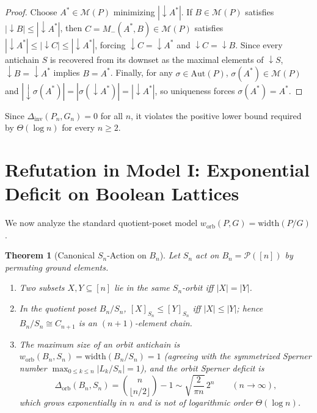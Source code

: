 \documentclass[11pt,a4paper]{article}
\newtheorem{theorem}{Theorem}[section]
\theoremstyle{definition}
\newcommand{\Bn}{B_n}
\newcommand{\Sn}{S_n}
\newcommand{\Aut}{\mathrm{Aut}}
\newcommand{\width}{\mathrm{width}}
\newcommand{\worb}{w_{\mathrm{orb}}}
\newcommand{\Dorb}{\Delta_{\mathrm{orb}}}
\newcommand{\Dinv}{\Delta_{\mathrm{inv}}}
\begin{document}
\begin{proof}
Choose $A^* \in \mathcal{M}(P)$ minimizing $|{\downarrow}A^*|$. If $B \in \mathcal{M}(P)$ satisfies $|{\downarrow}B| \le |{\downarrow}A^*|$, then $C = M_-(A^*,B) \in \mathcal{M}(P)$ satisfies $|{\downarrow}A^*| \le |{\downarrow}C| \le |{\downarrow}A^*|$, forcing ${\downarrow}C = {\downarrow}A^*$ and ${\downarrow}C = {\downarrow}B$. Since every antichain $S$ is recovered from its downset as the maximal elements of ${\downarrow}S$, ${\downarrow}B = {\downarrow}A^*$ implies $B = A^*$. Finally, for any $\sigma \in \Aut(P)$, $\sigma(A^*) \in \mathcal{M}(P)$ and $|{\downarrow}\sigma(A^*)| = |\sigma({\downarrow}A^*)| = |{\downarrow}A^*|$, so uniqueness forces $\sigma(A^*) = A^*$.
\end{proof}

Since $\Dinv(P_n, G_n) = 0$ for all $n$, it violates the positive lower bound required by $\Theta(\log n)$ for every $n \ge 2$.

\section{Refutation in Model I: Exponential Deficit on Boolean Lattices}

We now analyze the standard quotient-poset model $\worb(P,G) = \width(P/G)$.

\begin{theorem}[Canonical $\Sn$-Action on $\Bn$]\label{thm:bn-sn}
Let $\Sn$ act on $\Bn = \mathcal{P}([n])$ by permuting ground elements.
\begin{enumerate}
  \item[(a)] Two subsets $X, Y \subseteq [n]$ lie in the same $\Sn$-orbit iff $|X| = |Y|$.
  \item[(b)] In the quotient poset $\Bn/\Sn$, $[X]_{\Sn} \le [Y]_{\Sn}$ iff $|X| \le |Y|$; hence $\Bn/\Sn \cong C_{n+1}$ is an $(n+1)$-element chain.
  \item[(c)] The maximum size of an orbit antichain is $\worb(\Bn, \Sn) = \width(\Bn/\Sn) = 1$ (agreeing with the symmetrized Sperner number $\max_{0 \le k \le n} |L_k/\Sn| = 1$), and the orbit Sperner deficit is
  \[
    \Dorb(\Bn, \Sn) = \binom{n}{\lfloor n/2 \rfloor} - 1 \sim \sqrt{\frac{2}{\pi n}}\,2^n \qquad (n \to \infty),
  \]
  which grows exponentially in $n$ and is not of logarithmic order $\Theta(\log n)$.
\end{enumerate}
\end{theorem}
\end{document}

